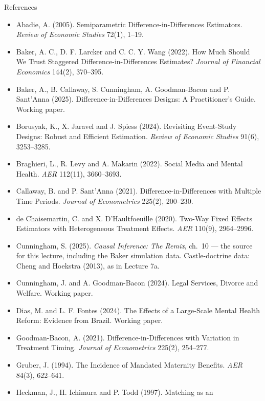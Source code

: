 \documentclass[
  11pt,
  ignorenonframetext,
  aspectratio=169,
]{beamer}
\providecommand{\tightlist}{%
  \setlength{\itemsep}{0pt}\setlength{\parskip}{0pt}}
\begin{document}
\begin{frame}{References}
\protect{}\label{references}
\tiny

\begin{itemize}
\tightlist
\item
  Abadie, A. (2005). Semiparametric Difference-in-Differences
  Estimators. \emph{Review of Economic Studies} 72(1), 1--19.
\item
  Baker, A. C., D. F. Larcker and C. C. Y. Wang (2022). How Much Should
  We Trust Staggered Difference-in-Differences Estimates? \emph{Journal
  of Financial Economics} 144(2), 370--395.
\item
  Baker, A., B. Callaway, S. Cunningham, A. Goodman-Bacon and P.
  Sant'Anna (2025). Difference-in-Differences Designs: A Practitioner's
  Guide. Working paper.
\item
  Borusyak, K., X. Jaravel and J. Spiess (2024). Revisiting Event-Study
  Designs: Robust and Efficient Estimation. \emph{Review of Economic
  Studies} 91(6), 3253--3285.
\item
  Braghieri, L., R. Levy and A. Makarin (2022). Social Media and Mental
  Health. \emph{AER} 112(11), 3660--3693.
\item
  Callaway, B. and P. Sant'Anna (2021). Difference-in-Differences with
  Multiple Time Periods. \emph{Journal of Econometrics} 225(2),
  200--230.
\item
  de Chaisemartin, C. and X. D'Haultfoeuille (2020). Two-Way Fixed
  Effects Estimators with Heterogeneous Treatment Effects. \emph{AER}
  110(9), 2964--2996.
\item
  Cunningham, S. (2025). \emph{Causal Inference: The Remix}, ch.~10 ---
  the source for this lecture, including the Baker simulation data.
  Castle-doctrine data: Cheng and Hoekstra (2013), as in Lecture 7a.
\item
  Cunningham, J. and A. Goodman-Bacon (2024). Legal Services, Divorce
  and Welfare. Working paper.
\item
  Dias, M. and L. F. Fontes (2024). The Effects of a Large-Scale Mental
  Health Reform: Evidence from Brazil. Working paper.
\item
  Goodman-Bacon, A. (2021). Difference-in-Differences with Variation in
  Treatment Timing. \emph{Journal of Econometrics} 225(2), 254--277.
\item
  Gruber, J. (1994). The Incidence of Mandated Maternity Benefits.
  \emph{AER} 84(3), 622--641.
\item
  Heckman, J., H. Ichimura and P. Todd (1997). Matching as an

\end{itemize}
\end{frame}
\end{document}
